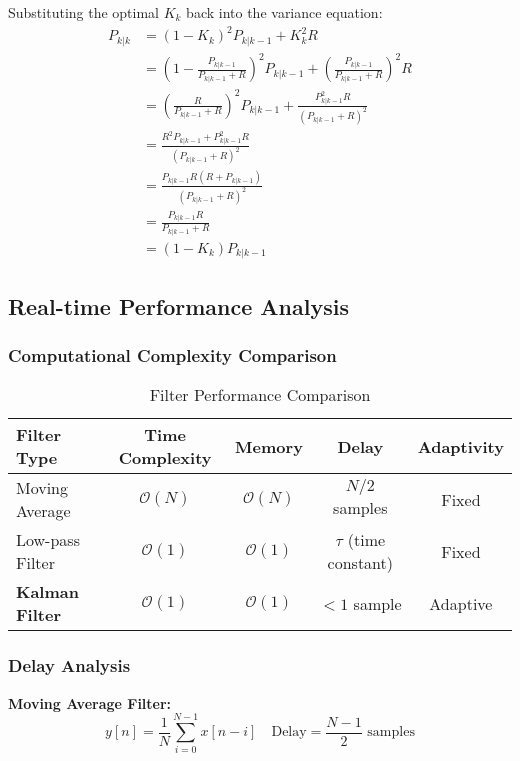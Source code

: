 \documentclass{article}
\begin{document}
Substituting the optimal $K_k$ back into the variance equation:
\begin{align}
P_{k|k} &= (1-K_k)^2 P_{k|k-1} + K_k^2 R \\
&= \left(1-\frac{P_{k|k-1}}{P_{k|k-1} + R}\right)^2 P_{k|k-1} + \left(\frac{P_{k|k-1}}{P_{k|k-1} + R}\right)^2 R \\
&= \left(\frac{R}{P_{k|k-1} + R}\right)^2 P_{k|k-1} + \frac{P_{k|k-1}^2 R}{(P_{k|k-1} + R)^2} \\
&= \frac{R^2 P_{k|k-1} + P_{k|k-1}^2 R}{(P_{k|k-1} + R)^2} \\
&= \frac{P_{k|k-1} R (R + P_{k|k-1})}{(P_{k|k-1} + R)^2} \\
&= \frac{P_{k|k-1} R}{P_{k|k-1} + R} \\
&= (1-K_k)P_{k|k-1} \label{eq:covariance_update}
\end{align}

\subsection{Real-time Performance Analysis}

\subsubsection{Computational Complexity Comparison}

\begin{table}[h]
\centering
\begin{tabular}{|l|c|c|c|c|}
\hline
\textbf{Filter Type} & \textbf{Time Complexity} & \textbf{Memory} & \textbf{Delay} & \textbf{Adaptivity} \\
\hline
Moving Average & $\mathcal{O}(N)$ & $\mathcal{O}(N)$ & $N/2$ samples & Fixed \\
Low-pass Filter & $\mathcal{O}(1)$ & $\mathcal{O}(1)$ & $\tau$ (time constant) & Fixed \\
\textbf{Kalman Filter} & $\mathcal{O}(1)$ & $\mathcal{O}(1)$ & $<1$ sample & Adaptive \\
\hline
\end{tabular}
\caption{Filter Performance Comparison}
\end{table}

\subsubsection{Delay Analysis}

\textbf{Moving Average Filter:}
\begin{equation}
y[n] = \frac{1}{N}\sum_{i=0}^{N-1} x[n-i] \quad \text{Delay} = \frac{N-1}{2} \text{ samples}
\end{equation}
\end{document}

